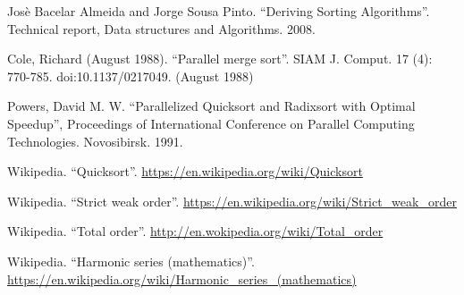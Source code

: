 \documentclass[b5paper]{article}
\begin{document}
\begin{thebibliography}{99}
Jos\`{e} Bacelar Almeida and Jorge Sousa Pinto. ``Deriving Sorting Algorithms''. Technical report, Data structures and Algorithms. 2008.

Cole, Richard (August 1988). ``Parallel merge sort''. SIAM J. Comput. 17 (4): 770-785. doi:10.1137/0217049. (August 1988)

Powers, David M. W. ``Parallelized Quicksort and Radixsort with Optimal Speedup'', Proceedings of International Conference on Parallel Computing Technologies. Novosibirsk. 1991.

Wikipedia. ``Quicksort''. \url{https://en.wikipedia.org/wiki/Quicksort}

Wikipedia. ``Strict weak order''. \url{https://en.wikipedia.org/wiki/Strict_weak_order}

Wikipedia. ``Total order''. \url{http://en.wokipedia.org/wiki/Total_order}

Wikipedia. ``Harmonic series (mathematics)''. \url{https://en.wikipedia.org/wiki/Harmonic_series_(mathematics)}

\end{thebibliography}

\expandafter\enddocument
\fi
\end{document}
